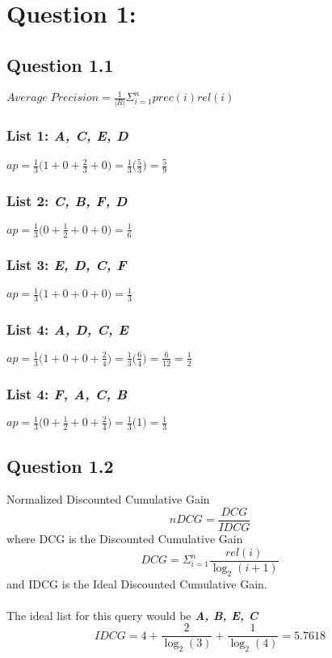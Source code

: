 \section*{Question 1:}
\subsection*{Question 1.1}
$Average\;Precision = \frac{1}{|R|} \Sigma_{i=1}^n prec(i)rel(i)$
\subsubsection*{List 1: \textbf{\textit{A, C, E, D}}}
$ap = \frac{1}{3} \big(1+ 0 + \frac{2}{3} + 0\big) = \frac{1}{3}\big(\frac{5}{3}\big) = \frac{5}{9}$

\subsubsection*{List 2: \textbf{\textit{C, B, F, D}}}
$ap = \frac{1}{3} \big(0 + \frac{1}{2} + 0 + 0\big) = \frac{1}{6}$

\subsubsection*{List 3: \textbf{\textit{E, D, C, F}}}
$ap = \frac{1}{3} \big(1 + 0 + 0 + 0\big) = \frac{1}{3}$

\subsubsection*{List 4: \textbf{\textit{A, D, C, E}}}
$ap = \frac{1}{3} \big(1+ 0 + 0 + \frac{2}{4}\big) = \frac{1}{3}\big(\frac{6}{4}\big) = \frac{6}{12} = \frac{1}{2}$

\subsubsection*{List 4: \textbf{\textit{F, A, C, B}}}
$ap = \frac{1}{3} \big(0 + \frac{1}{2} + 0 + \frac{2}{4}\big) = \frac{1}{3}\big(1\big)= \frac{1}{3}$

\subsection*{Question 1.2}
Normalized Discounted Cumulative Gain
$$
nDCG = \frac{DCG}{IDCG}
$$
where DCG is the Discounted Cumulative Gain
$$
DCG = \Sigma_{i=1}^n \frac{rel(i)}{\log_2(i+1)}
$$
and IDCG is the Ideal Discounted Cumulative Gain.\\\\
The ideal list for this query would be \textbf{\textit{A, B, E, C}}
$$
IDCG = 4 + \frac{2}{\log_2(3)} + \frac{1}{\log_2(4)} = 5.7618
$$

